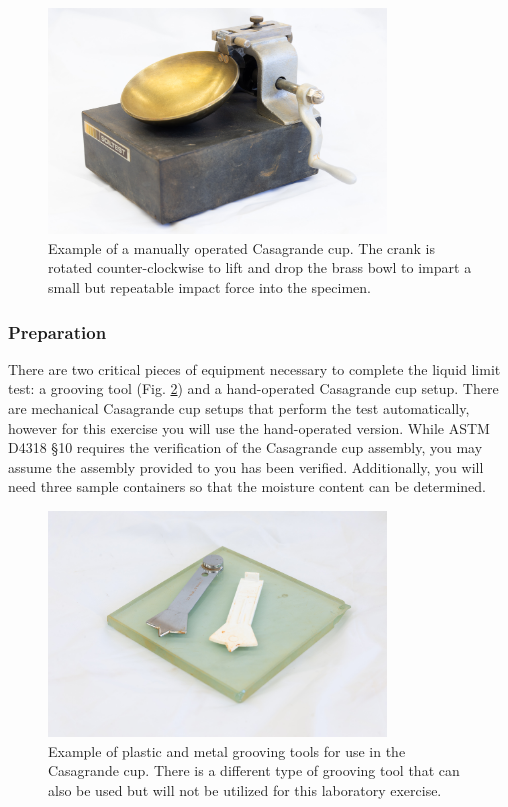 \documentclass[12pt]{article}
\begin{document}
\begin{figure}[H]
    \centering
    \includegraphics[width=0.8\textwidth]{GEO_5747.jpg}
    \caption{Example of a manually operated Casagrande cup. The crank is rotated counter-clockwise to lift and drop the brass bowl to impart a small but repeatable impact force into the specimen.}
    \label{fig:casagrandecup}
\end{figure}

\subsubsection{Preparation}
There are two critical pieces of equipment necessary to complete the liquid limit test: a grooving tool (Fig. \ref{fig:groovingtool}) and a hand-operated Casagrande cup setup. There are mechanical Casagrande cup setups that perform the test automatically, however for this exercise you will use the hand-operated version. While ASTM D4318 \S10 requires the verification of the Casagrande cup assembly, you may assume the assembly provided to you has been verified. Additionally, you will need three sample containers so that the moisture content can be determined. 

\begin{figure}[H]
    \centering
    \includegraphics[width=0.8\textwidth]{GEO_5748.jpg}
    \caption{Example of plastic and metal grooving tools for use in the Casagrande cup. There is a different type of grooving tool that can also be used but will not be utilized for this laboratory exercise.}
    \label{fig:groovingtool}
\end{figure}
\end{document}
